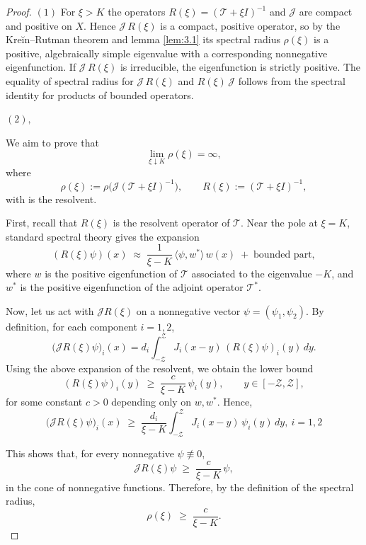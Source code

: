 \documentclass[a4paper,11pt]{amsart}
\theoremstyle{definition}
\numberwithin{equation}{section}
\theoremstyle{definition}
\begin{document}
\begin{proof}


$(1)$ For $\xi>K$ the operators $R(\xi)=(\mathscr T+\xi I)^{-1}$ and $\mathscr J$ are compact and positive on $X$. Hence $\mathscr J\,R(\xi)$ is a compact, positive operator, so by the Kreĭn--Rutman theorem and lemma \eqref{lem:3.1} its spectral radius $\rho(\xi)$ is a positive, algebraically simple eigenvalue with a corresponding nonnegative eigenfunction. If $\mathscr J\,R(\xi)$ is irreducible, the eigenfunction is strictly positive. The equality of spectral radius for $\mathscr J\,R(\xi)$ and $R(\xi)\,\mathscr J$ follows from the spectral identity for products of bounded operators.

$(2),$

We aim to prove that
\[
\lim_{\xi \downarrow K} \rho(\xi) = \infty,
\]
where
\[
\rho(\xi) := \rho\!\big(\mathscr J (\mathscr T + \xi I)^{-1}\big),
\qquad
R(\xi) := (\mathscr T + \xi I)^{-1},
\]
with is the resolvent.
\smallskip

\noindent
First, recall that \(R(\xi)\) is the resolvent operator of \(\mathscr T\).
Near the pole at \(\xi = K\), standard spectral theory gives the expansion
\[
(R(\xi)\psi)(x) \;\approx\; \frac{1}{\xi - K}\,\langle \psi, w^{\ast} \rangle\, w(x) \;+\; \text{bounded part},
\]
where \(w\) is the positive eigenfunction of \(\mathscr T\) associated to the eigenvalue \(-K\), and \(w^{\ast}\) is the positive eigenfunction of the adjoint operator \(\mathscr T^{\ast}\).

\smallskip

\noindent
Now, let us act with \(\mathscr J R(\xi)\) on a nonnegative vector
\(\psi = (\psi_1,\psi_2)\). By definition, for each component \(i=1,2\),
\[
\big(\mathscr J R(\xi)\psi\big)_i(x)
= d_i \int_{-\mathcal Z}^{\mathcal Z} J_i(x-y)\,(R(\xi)\psi)_i(y)\,dy.
\]
Using the above expansion of the resolvent, we obtain the lower bound
\[
(R(\xi)\psi)_i(y) \;\geq\; \frac{c}{\xi - K}\,\psi_i(y),
\qquad y \in [-\mathcal Z,\mathcal Z],
\]
for some constant \(c>0\) depending only on \(w,w^{\ast}\). Hence,
\[
\big(\mathscr J R(\xi)\psi\big)_i(x)
\;\geq\; \frac{d_i}{\xi - K} \int_{-\mathcal Z}^{\mathcal Z} J_i(x-y)\,\psi_i(y)\,dy,~ i=1,2
\]

\smallskip

\noindent
This shows that, for every nonnegative \(\psi \not\equiv 0\),
\[
\mathscr J R(\xi)\psi \;\geq\; \frac{c}{\xi - K}\, \psi,
\]
in the cone of nonnegative functions. Therefore, by the definition of the spectral radius,
\[
\rho(\xi) \;\geq\; \frac{c}{\xi - K}.
\]


\end{proof}
\end{document}
